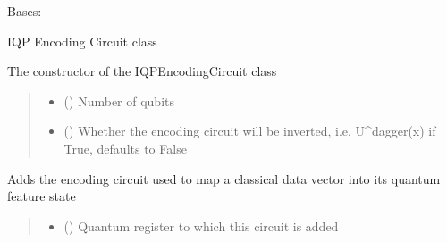 \documentclass[letterpaper,10pt,english]{sphinxmanual}
\begin{document}
\begin{fulllineitems}
\label{\detokenize{qcompute_qapp.circuit:qcompute_qapp.circuit.IQPEncodingCircuit}}
\pysigstartsignatures
{}
\pysigstopsignatures
\sphinxAtStartPar
Bases: {\hyperref[\detokenize{qcompute_qapp.circuit:qcompute_qapp.circuit.BasicCircuit}]{}}

\sphinxAtStartPar
IQP Encoding Circuit class

\sphinxAtStartPar
The constructor of the IQPEncodingCircuit class
\begin{quote}\begin{description}
\begin{itemize}
\item {} 
\sphinxAtStartPar
{} () \textendash{} Number of qubits

\item {} 
\sphinxAtStartPar
{} () \textendash{} Whether the encoding circuit will be inverted, i.e. U\textasciicircum{}dagger(x) if True, defaults to False

\end{itemize}

\end{description}\end{quote}

\begin{fulllineitems}
\label{\detokenize{qcompute_qapp.circuit:qcompute_qapp.circuit.IQPEncodingCircuit.add_circuit}}
\pysigstartsignatures
{}
\pysigstopsignatures
\sphinxAtStartPar
Adds the encoding circuit used to map a classical data vector into its quantum feature state
\begin{quote}\begin{description}
\begin{itemize}
\item {} 
\sphinxAtStartPar
{} () \textendash{} Quantum register to which this circuit is added


\end{itemize}
\end{description}
\end{quote}
\end{fulllineitems}
\end{fulllineitems}
\end{document}
